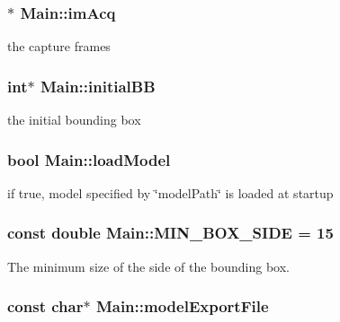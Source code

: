 \hypertarget{classMain_a37f97b28ea0f64421b5a0bb590059321}{
\subsubsection[{im\-Acq}]{$\ast$ Main\-::im\-Acq}}\label{classMain_a37f97b28ea0f64421b5a0bb590059321}


the capture frames 

\hypertarget{classMain_a0f8b49ea51db0779192fb254c5e31e22}{
\subsubsection[{initial\-B\-B}]{\setlength{\rightskip}{0pt plus 5cm}int$\ast$ Main\-::initial\-B\-B}}\label{classMain_a0f8b49ea51db0779192fb254c5e31e22}


the initial bounding box 

\hypertarget{classMain_ad0301eff91ba4a68e41e28f238f5a743}{
\subsubsection[{load\-Model}]{\setlength{\rightskip}{0pt plus 5cm}bool Main\-::load\-Model}}\label{classMain_ad0301eff91ba4a68e41e28f238f5a743}


if true, model specified by \char`\"{}model\-Path\char`\"{} is loaded at startup 

\hypertarget{classMain_a6246be52b3709cc7114173579fb45eb0}{
\subsubsection[{M\-I\-N\-\_\-\-B\-O\-X\-\_\-\-S\-I\-D\-E}]{\setlength{\rightskip}{0pt plus 5cm}const double Main\-::\-M\-I\-N\-\_\-\-B\-O\-X\-\_\-\-S\-I\-D\-E = 15\hspace{0.3cm}{\ttfamily [static]}}}\label{classMain_a6246be52b3709cc7114173579fb45eb0}


The minimum size of the side of the bounding box. 

\hypertarget{classMain_a3003ab9835173ebf15939e4b97143615}{
\subsubsection[{model\-Export\-File}]{\setlength{\rightskip}{0pt plus 5cm}const char$\ast$ Main\-::model\-Export\-File}}\label{classMain_a3003ab9835173ebf15939e4b97143615}



